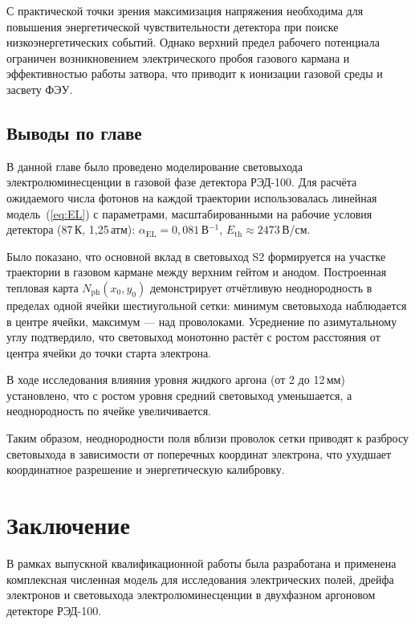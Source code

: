 \documentclass[12pt]{article}
\begin{document}
С практической точки зрения максимизация напряжения необходима для повышения энергетической чувствительности детектора при поиске низкоэнергетических событий. Однако верхний предел рабочего потенциала ограничен возникновением электрического пробоя газового кармана и эффективностью работы затвора, что приводит к ионизации газовой среды и засвету ФЭУ.

\subsection{Выводы по главе}

В данной главе было проведено моделирование световыхода электролюминесценции
в газовой фазе детектора РЭД-100. Для расчёта ожидаемого числа фотонов на
каждой траектории использовалась линейная модель~(\ref{eq:EL}) с
параметрами, масштабированными на рабочие условия детектора (87\,К,
1{,}25\,атм): $\alpha_\text{EL} = 0{,}081$\,В$^{-1}$,
$E_\text{th} \approx 2473$\,В/см.

Было показано, что основной вклад в световыход S2 формируется на участке
траектории в газовом кармане между верхним гейтом и анодом. Построенная
тепловая карта $N_\text{ph}(x_0, y_0)$ демонстрирует отчётливую
неоднородность в пределах одной ячейки шестиугольной сетки: минимум
световыхода наблюдается в центре ячейки, максимум --- над проволоками.
Усреднение по азимутальному углу подтвердило, что световыход монотонно
растёт с ростом расстояния от центра ячейки до точки старта электрона.

В ходе исследования влияния уровня жидкого аргона (от 2
до 12\,мм) установлено, что с ростом уровня средний световыход уменьшается,
а неоднородность по ячейке увеличивается.

Таким образом, неоднородности поля вблизи проволок сетки приводят к
разбросу световыхода в зависимости от поперечных координат электрона, что
ухудшает координатное разрешение и энергетическую калибровку.

\newpage
\section*{Заключение}

В рамках выпускной квалификационной работы была разработана и применена
комплексная численная модель для исследования электрических полей, дрейфа
электронов и световыхода электролюминесценции в двухфазном аргоновом
детекторе РЭД-100.
\end{document}
